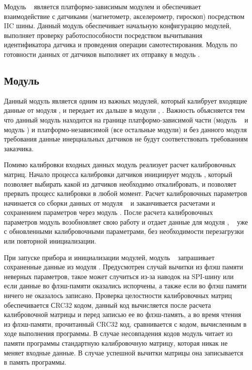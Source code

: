Модуль \modulePerifery~ является платформо-зависимым модулем и обеспечивает взаимодействие с датчиками
(магнетометр, акселерометр, гироскоп) посредством IIC шины. Данный модуль обеспечивает начальную конфигурацию 
модулей, выполняет проверку работоспособности посредством вычитывания идентификатора датчика и проведения 
операции самотестирования. Модуль по готовности данных от датчиков выполняет их отправку в модуль \moduleCalib.

\subsection{Модуль \moduleCalib}

Данный модуль является одним из важных модулей, который калибрует входящие данные от модуля \modulePerifery, и передает их дальше
в модули \moduleMoveDetect, \moduleOrientationAzimuth. Важность объясняется тем что данный модуль 
находится на границе платформо-зависимой части (модуль \modulePerifery~ и модуль \moduleFlashMemory) и платформо-независимой (все остальные модули) и 
без данного модуля требования данные инерциальных датчиков не будут соответствовать требованиям заказчика.

Помимо калибровки входных данных модуль реализует расчет калибровочных матриц. Начало процесса калибровки датчиков инициирует модуль \moduleCalibControl,
который позволяет выбирать какой из датчиков необходимо откалибровать, и позволяет прервать процесс калибровки в любой момент. Расчет калибровочных 
параметров начинается со сборки данных от модуля \modulePerifery~ и заканчивается расчетами и сохранением параметров через модуль \moduleFlashMemory.
После расчета калибровочных параметров модуль возобновляет свою работу и отдает данные для модуля \moduleOrientationAzimuth, \moduleMoveDetect~
уже с обновленными калибровочными параметрами, без необходимости перезагрузки или повторной инициализации. 

При запуске прибора и инициализации модулей, модуль \moduleCalib~ запрашивает сохраненные данные из модуля \moduleFlashMemory.
Предусмотрен случай вычитки из флэш памяти неверных параметров, такое может случиться из-за наводок на SPI-шину или если данные во флэш-памяти
оказались испорчены, а также если во флэш памяти ничего не оказалось записано.
Проверка целостности калибровочных матриц обеспечивается СRC32 кодом,
данный код вычисляется после расчета калибровочной матрицы и перед записью ее во флэш-память, а во время чтения из флэш-памяти, прочитанный
CRC32 код, сравнивается с кодом, вычисленным в ходе выполнения программы.
В случае несовпадения кодов модуль читает из памяти программы
стандартную калибровочную матрицу, которая никак не меняет входные данные. В случае успешной вычитки матрицы она записывается в память программы.

